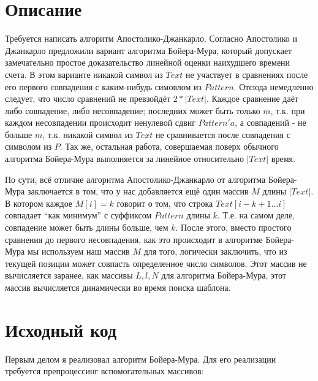\section{Описание}

Требуется написать алгоритм Апостолико-Джанкарло. Согласно \cite{Gusfield} Апостолико и Джанкарло предложили вариант алгоритма Бойера-Мура, который допускает замечательно простое доказательство линейной оценки наихудшего времени счета. В этом варианте никакой символ из $Text$ не участвует в сравнениях после его первого совпадения с каким-нибудь симовлом из $Pattern$. Отсюда немедленно следует, что число сравнений не превзойдёт $2 * |Text|$. Каждое сравнение даёт либо совпадение, либо несовпадение; последних может быть только $m$, т.к. при каждом несовпадении происходит ненулевой сдвиг $Pattern'a$, а совпадений - не больше $m$, т.к. никакой символ из $Text$ не сравнивается после совпадения с символом из $P$. Так же, остальная работа, совершаемая поверх обычного алгоритма Бойера-Мура выполняется за линейное относительно $|Text|$ время.

По сути, всё отличие алгоритма Апостолико-Джанкарло от алгоритма Бойера-Мура заключается в том, что у нас добавляется ещё один массив $M$ длины $|Text|$. В котором каждое $M[i] = k$ говорит о том, что строка $Text[i - k + 1 ... i]$ совпадает \enquote{как минимум} с суффиксом $Pattern$ длины $k$. Т.е. на самом деле, совпадение может быть длины больше, чем $k$. После этого, вместо простого сравнения до первого несовпадения, как это происходит в алгоритме Бойера-Мура мы используем наш массив $M$ для того, логически заключить, что из текущей позиции может совпасть определенное число символов. Этот массив не вычисляется заранее, как массивы $L, l, N$ для алгоритма Бойера-Мура, этот массив вычисляется динамически во время поиска шаблона.

\pagebreak

\section{Исходный код}
Первым делом я реализовал алгоритм Бойера-Мура. Для его реализации требуется препроцессинг вспомогательных массивов:

